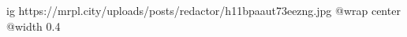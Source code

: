  
 
 
 
 

\ifcmt
  ig https://mrpl.city/uploads/posts/redactor/h11bpaaut73eezng.jpg
  @wrap center
  @width 0.4
\fi
